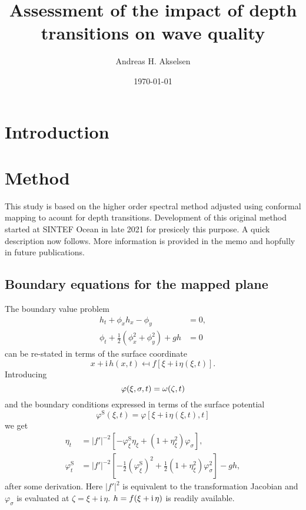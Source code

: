 \documentclass[internal]{sintefmemo}
\title{Assessment of the impact of depth transitions on wave quality}
\author{Andreas H. Akselsen}
\date{\today}
\newcommand{\mr}{\mathrm}
\renewcommand{\S}{^\mr{S}}
\newcommand{\ii}{\mr{i}\,}
\renewcommand{\_}[1]{_\mr{#1}}
\let\Re\relax
\let\Im\relax
\DeclareMathOperator\Re{Re}
\DeclareMathOperator\Im{Im}
\newcommand{\rbr}[1]{\left(#1\right)}
\newcommand{\sbr}[1]{\left[#1\right]}
\newcommand{\x}{x}
\newcommand{\zz}{\zeta}
\newcommand{\xx}{\xi}
\newcommand{\yy}{\sigma}
\newcommand{\zmap}{f}
\newcommand{\ww}{\omega}
\begin{document}
\frontmatter
\tableofcontents

\section{Introduction}




\section{Method}
\label{sec:method}

This study is based on the higher order spectral method adjusted using conformal mapping to acount for depth transitions. 
Development of this original method started at SINTEF Ocean in late 2021 for presicely this purpose.
A quick description now follows. 
More information is provided in the memo \citet{AHA_2021_conformalHOS} and hopfully in future publications.

\subsection{Boundary equations for the mapped plane}
The boundary value problem 
\begin{align*}
h_t + \phi_x h_x-\phi_y&=0,\\
\phi_t + \frac12\rbr{\phi_x^2+\phi_y^2}+gh&=0
\end{align*}
can be re-stated in terms of the surface coordinate
\[
\x+\ii h(\x,t) \mapsfrom f[\xx+\ii \eta(\xx,t)].
\]
Introducing
\[\varphi(\xx,\yy,t)=\Re\ww(\zz,t) \]
and the boundary conditions expressed in terms of the surface potential 
\[
\varphi\S(\xx,t)=\varphi[\xx+\ii\eta(\xx,t),t]
\]
we get 
\begin{subequations}
\begin{align}
\eta_t &= |\zmap'|^{-2} \sbr{-   \varphi\S_\xx\eta_\xx + \rbr{1+\eta_\xx^2} \varphi_\yy},\\
\varphi\S_t  &= |\zmap'|^{-2}\sbr{ - \frac12  \rbr{\varphi\S_\xx}^2 + \frac12 \rbr{1+\eta_\xx^2} \varphi_\yy^2 }  - g h,
\end{align}%
\end{subequations}%
after some derivation.
Here $|\zmap'|^{2}$ is equivalent to the transformation Jacobian and $\varphi_\yy$ is evaluated at $\zz=\xx+\ii\eta$.
$h=\Im \zmap(\xx+\ii\eta)$ is readily available. 
\end{document}
